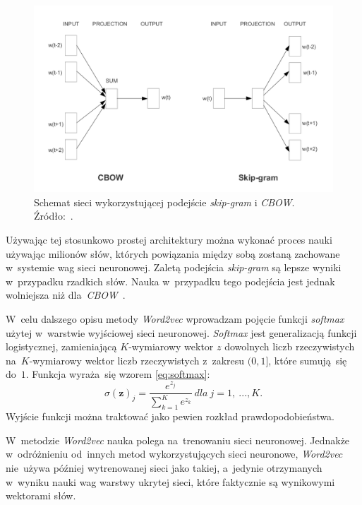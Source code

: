 \documentclass[pl]{minipw} %
\begin{document}
\begin{figure}[H]
	\centering
	\includegraphics[width=1\textwidth]{img/skipgram_cbow.png}
	\caption{Schemat sieci wykorzystującej podejście \textit{skip-gram} i \textit{CBOW}. Źródło:~\cite{word2vec}.}
\end{figure}
Używając tej stosunkowo prostej architektury można wykonać proces nauki używając milionów słów, których powiązania między sobą zostaną zachowane w~systemie wag sieci neuronowej. Zaletą podejścia \textit{skip-gram} są lepsze wyniki w~przypadku rzadkich słów. Nauka w~przypadku tego podejścia jest jednak wolniejsza niż dla~\textit{CBOW}~\cite{google_word2vec}.

W~celu dalszego opisu metody \textit{Word2vec} wprowadzam pojęcie funkcji \textit{softmax} użytej w~warstwie wyjściowej sieci neuronowej. \textit{Softmax} jest generalizacją funkcji logistycznej, zamieniającą $K$-wymiarowy wektor $z$ dowolnych liczb rzeczywistych na~$K$-wymiarowy wektor liczb rzeczywistych z~zakresu $(0,1]$, które sumują~się do~$1$. Funkcja wyraża~się wzorem \ref{eq:softmax}:
\begin{equation}
\label{eq:softmax}
\sigma (\mathbf {z} )_{j}={\frac {e^{z_{j}}}{\sum _{k=1}^{K}e^{z_{k}}}}\ dla\ j=1,\ ...,K.
\end{equation}
Wyjście funkcji można traktować jako pewien rozkład prawdopodobieństwa.

W~metodzie \textit{Word2vec} nauka polega na~trenowaniu sieci neuronowej. Jednakże w~odróżnieniu od~innych metod wykorzystujących sieci neuronowe, \textit{Word2vec} nie~używa później wytrenowanej sieci jako takiej, a~jedynie otrzymanych w~wyniku nauki wag warstwy ukrytej sieci, które faktycznie są wynikowymi wektorami słów.
\end{document}
